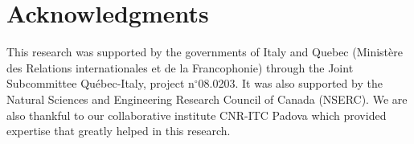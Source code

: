 \section*{Acknowledgments}       
 
This research was supported by the governments of Italy and Quebec (Minist\`{e}re des Relations internationales et de la Francophonie) through the Joint Subcommittee Qu\'{e}bec-Italy, project n$^{\circ}$08.0203. It was also supported by  the Natural Sciences and Engineering Research Council of Canada (NSERC). We are also thankful to our collaborative institute CNR-ITC Padova which provided expertise that greatly helped in this research.


 
